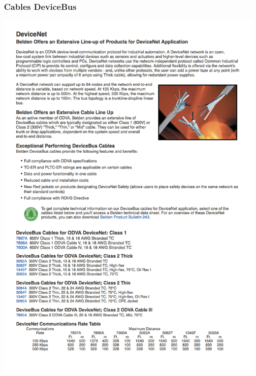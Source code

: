 \subsubsection{Cables DeviceBus}
\includegraphics[width=1\textwidth]{Datasheets/DeviceBus.png}
\newpage


